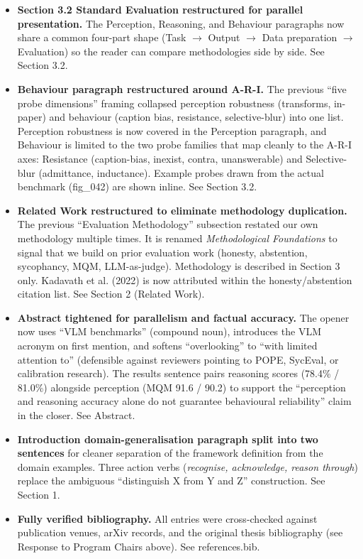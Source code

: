 \documentclass[11pt]{article}
\newcommand{\revsec}[1]{\textcolor{revisiongreen}{#1}}
\begin{document}
\begin{itemize}[nosep,leftmargin=*]
\item \textbf{Section 3.2 Standard Evaluation restructured for parallel presentation.} The Perception, Reasoning, and Behaviour paragraphs now share a common four-part shape (Task $\rightarrow$ Output $\rightarrow$ Data preparation $\rightarrow$ Evaluation) so the reader can compare methodologies side by side. See \revsec{Section 3.2}.
\item \textbf{Behaviour paragraph restructured around A-R-I.} The previous ``five probe dimensions'' framing collapsed perception robustness (transforms, in-paper) and behaviour (caption bias, resistance, selective-blur) into one list. Perception robustness is now covered in the Perception paragraph, and Behaviour is limited to the two probe families that map cleanly to the A-R-I axes: Resistance (caption-bias, inexist, contra, unanswerable) and Selective-blur (admittance, inductance). Example probes drawn from the actual benchmark (fig\_042) are shown inline. See \revsec{Section 3.2}.
\item \textbf{Related Work restructured to eliminate methodology duplication.} The previous ``Evaluation Methodology'' subsection restated our own methodology multiple times. It is renamed \emph{Methodological Foundations} to signal that we build on prior evaluation work (honesty, abstention, sycophancy, MQM, LLM-as-judge). Methodology is described in \revsec{Section 3} only. Kadavath et al. (2022) is now attributed within the honesty/abstention citation list. See \revsec{Section 2 (Related Work)}.
\item \textbf{Abstract tightened for parallelism and factual accuracy.} The opener now uses ``VLM benchmarks'' (compound noun), introduces the VLM acronym on first mention, and softens ``overlooking'' to ``with limited attention to'' (defensible against reviewers pointing to POPE, SycEval, or calibration research). The results sentence pairs reasoning scores (78.4\% / 81.0\%) alongside perception (MQM 91.6 / 90.2) to support the ``perception and reasoning accuracy alone do not guarantee behavioural reliability'' claim in the closer. See \revsec{Abstract}.
\item \textbf{Introduction domain-generalisation paragraph split into two sentences} for cleaner separation of the framework definition from the domain examples. Three action verbs (\emph{recognise, acknowledge, reason through}) replace the ambiguous ``distinguish X from Y and Z'' construction. See \revsec{Section 1}.
\item \textbf{Fully verified bibliography.} All entries were cross-checked against publication venues, arXiv records, and the original thesis bibliography (see Response to Program Chairs above). See \revsec{references.bib}.
\end{itemize}
\end{document}
